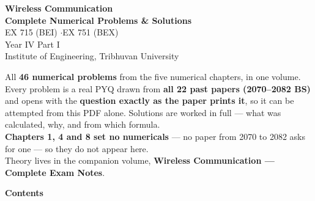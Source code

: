 \documentclass[10pt]{article}
\begin{document}
\thispagestyle{empty}
\vspace*{2.0cm}
\begin{center}
  {\Huge\bfseries\color{acc} Wireless Communication}\\[6pt]
  {\LARGE\bfseries Complete Numerical Problems \& Solutions}\\[14pt]
  {\large\color{sub} EX 715 (BEI) \quad$\cdot$\quad EX 751 (BEX)}\\[3pt]
  {\color{sub} Year IV Part I}\\[3pt]
  {\color{sub} Institute of Engineering, Tribhuvan University}\\[20pt]
  \begin{minipage}{0.78\textwidth}
    \color{sub}\small
    All \textbf{46 numerical problems} from the five numerical chapters, in one volume.
    Every problem is a real PYQ drawn from \textbf{all 22 past papers (2070--2082 BS)}
    and opens with the \textbf{question exactly as the paper prints it}, so it can be
    attempted from this PDF alone. Solutions are worked in full --- what was calculated,
    why, and from which formula.\\[8pt]
    \textbf{Chapters 1, 4 and 8 set no numericals} --- no paper from 2070 to 2082 asks
    for one --- so they do not appear here.\\[8pt]
    Theory lives in the companion volume,
    \textbf{Wireless Communication --- Complete Exam Notes}.
  \end{minipage}
\end{center}

\vfill

\vspace{1.2cm}

\cleardoublepage
\pagestyle{fancy}
{\Large\bfseries\color{acc} Contents}
\vspace{-6pt}{\color{acc}\rule{\textwidth}{1.1pt}}\vspace{4pt}
\begingroup
\renewcommand{\contentsname}{}
\setcounter{tocdepth}{1}
\vspace{-24pt}
\tableofcontents
\endgroup

\cleardoublepage
{}
{}

\end{document}
